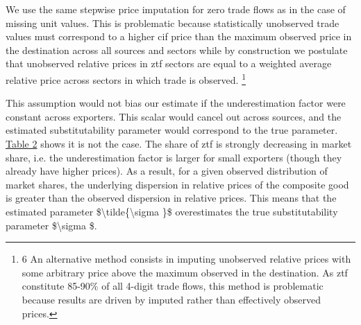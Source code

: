 \documentclass[12pt,twoside,a4paper,notitlepage]{article}
\begin{document}
We use the same stepwise price imputation for zero trade flows as in the case of missing unit values. This is problematic because statistically unobserved trade values must correspond to a higher cif price than the maximum observed price in the destination across all sources and sectors while by construction we postulate that unobserved relative prices in ztf sectors are equal to a weighted average relative price across sectors in which trade is observed. \footnote{6 An alternative method consists in imputing unobserved relative prices with some arbitrary price above the maximum observed in the destination. As ztf constitute 85-90\% of all 4-digit trade flows, this method is problematic because results are driven by imputed rather than effectively observed prices.
}

This assumption would not bias our estimate if the underestimation factor were constant across exporters. This scalar would cancel out across sources, and the estimated substitutability parameter would correspond to the true parameter. {\hyperref[ref-005]{Table 2}} shows it is not the case. The share of ztf is strongly decreasing in market share, i.e. the underestimation factor is larger for small exporters (though they already have higher prices). As a result, for a given observed distribution of market shares, the underlying dispersion in relative prices of the composite good is greater than the observed dispersion in relative prices. This means that the estimated parameter \$\textbackslash tilde\{\textbackslash sigma \}\$ overestimates the true substitutability parameter \$\textbackslash sigma \$.
\end{document}
